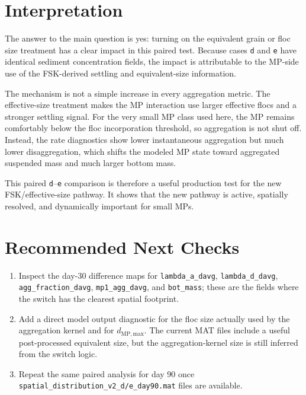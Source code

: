 \documentclass[11pt]{article}
\begin{document}
\section*{Interpretation}

The answer to the main question is yes: turning on the equivalent grain or floc
size treatment has a clear impact in this paired test.  Because cases
\texttt{d} and \texttt{e} have identical sediment concentration fields, the
impact is attributable to the MP-side use of the FSK-derived settling and
equivalent-size information.

The mechanism is not a simple increase in every aggregation metric.  The
effective-size treatment makes the MP interaction use larger effective flocs
and a stronger settling signal.  For the very small MP class used here, the MP
remains comfortably below the floc incorporation threshold, so aggregation is
not shut off.  Instead, the rate diagnostics show lower instantaneous
aggregation but much lower disaggregation, which shifts the modeled MP state
toward aggregated suspended mass and much larger bottom mass.

This paired \texttt{d}--\texttt{e} comparison is therefore a useful production
test for the new FSK/effective-size pathway.  It shows that the new pathway is
active, spatially resolved, and dynamically important for small MPs.

\section*{Recommended Next Checks}

\begin{enumerate}
  \item Inspect the day-30 difference maps for \texttt{lambda\_a\_davg},
        \texttt{lambda\_d\_davg}, \texttt{agg\_fraction\_davg},
        \texttt{mp1\_agg\_davg}, and \texttt{bot\_mass}; these are the fields
        where the switch has the clearest spatial footprint.
  \item Add a direct model output diagnostic for the floc size actually used by
        the aggregation kernel and for $d_{\mathrm{MP,max}}$.  The current MAT
        files include a useful post-processed equivalent size, but the
        aggregation-kernel size is still inferred from the switch logic.
  \item Repeat the same paired analysis for day 90 once
        \texttt{spatial\_distribution\_v2\_d/e\_day90.mat} files are
        available.
\end{enumerate}
\end{document}

